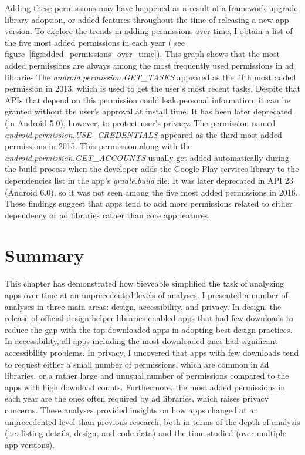 Adding these permissions may have happened as a result of a framework upgrade, library adoption, or added features throughout the time of releasing a new app version.
To explore the trends in adding permissions over time, I obtain a list of the five most added permissions in each year ( see figure~\ref{fig:added_permissions_over_time}).
This graph shows that the most added permissions are always among the most frequently used permissions in ad libraries \cite{Liu_2015_MobiSys}
The \textit{android.permission.GET\_TASKS} appeared as the fifth most added permission in 2013, which is used to get the user's most recent tasks.
Despite that APIs that depend on this permission could leak personal information, it can be granted without the user's approval at install time.
It has been later deprecated (in Android 5.0), however, to protect user's privacy.
The permission named \textit{android.permission.USE\_CREDENTIALS} appeared as the third most added permissions in 2015.
This permission along with the \textit{android.permission.GET\_ACCOUNTS} usually get added automatically during the build process when the developer adds the Google Play services library to the dependencies list in the app's \textit{gradle.build} file.
It was later deprecated in API 23 (Android 6.0), so it was not seen among the five most added permissions in 2016.
These findings suggest that apps tend to add more permissions related to either dependency or ad libraries rather than core app features.

\section{Summary}
This chapter has demonstrated how Sieveable simplified the task of analyzing apps over time at an unprecedented levels of analyses.
I presented a number of analyses in three main areas: design, accessibility, and privacy.
In design, the release of official design helper libraries enabled apps that had few downloads to reduce the gap with the top downloaded apps in adopting best design practices.
In accessibility, all apps including the most downloaded ones had significant accessibility problems.
In privacy, I uncovered that apps with few downloads tend to request either a small number of permissions, which are common in ad libraries, or a rather large and unusual number of permissions compared to the apps with high download counts.
Furthermore, the most added permissions in each year are the ones often required by ad libraries, which raises privacy concerns.
These analyses provided insights on how apps changed at an unprecedented level than previous research, both in terms of the depth of analysis (i.e. listing details, design, and code data) and the time studied (over multiple app versions).